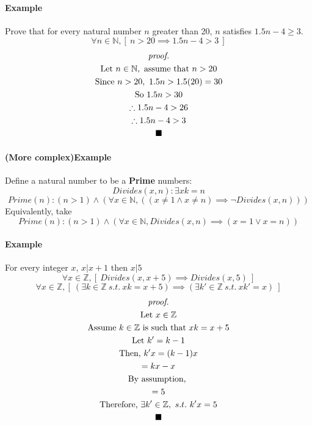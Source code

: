 \documentclass{article}
\begin{document}
	\paragraph{Example} Prove that for every natural number $n$ greater than 20, $n$ satisfies $1.5n-4\geq3$.
	\[
		\forall n \in \mathbb{N}, [\ n > 20 \implies 1.5n - 4 > 3\ ]
	\]
	\begin{multline*}
		\emph{proof.}\\
		\text{Let } n \in \mathbb{N}, \text{ assume that } n > 20 \\
		\text{Since } n > 20,\ 1.5n > 1.5(20) = 30 \\
		\text{So } 1.5 n > 30 \\
		\therefore 1.5n - 4 > 26 \\
		\therefore 1.5n - 4 > 3 \\
		\blacksquare
	\end{multline*}
	
	\paragraph{(More complex)Example} Define a natural number to be a \textbf{Prime} numbers:
	\[
		Divides(x,n): \exists x k = n
	\]
	\[
		Prime(n): (n > 1) \land (\forall x \in \mathbb{N}, ((x\neq1 \land x\neq n) \implies \neg Divides(x,n)))
	\]
	Equivalently, take 
	\[
		Prime(n): (n > 1) \land (\forall x \in \mathbb{N}, Divides(x,n) \implies (x = 1 \lor x = n))
	\]
	\paragraph{Example} For every integer $x$, $x \vert x + 1$ then $x \vert 5$
	\[
		\forall x \in \mathbb{Z}, [\ Divides(x, x+5) \implies Divides(x, 5)\ ]
	\]
	\[
		\forall x \in \mathbb{Z}, [\ (\exists k \in \mathbb{Z}\ s.t.\ xk = x + 5) \implies (\exists k' \in \mathbb{Z}\ s.t.\ xk' = x)\ ]
	\]
	\begin{multline*}
	\emph{proof.}\\
		\text{Let }x \in \mathbb{Z} \\
		\text{Assume } k \in \mathbb{Z} \text{ is such that } xk = x + 5 \\
		\text{Let } k' = k - 1 \\
		\text{Then, } k'x = (k - 1)x\\
		= kx - x \\
		\text{By assumption, } \\
		= 5 \\
		\text{Therefore, } \exists k' \in \mathbb{Z},\ s.t.\ k'x = 5 \\
		\blacksquare
	\end{multline*}
	
\end{document}
